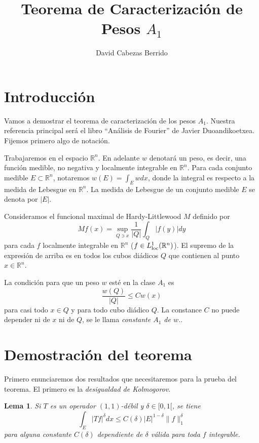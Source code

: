 \documentclass[12pt,english]{article}
\title{Teorema de Caracterización de Pesos $A_1$}
\author{David Cabezas Berrido}
\date{}
\newtheorem{lemma}[theorem]{Lema}
\theoremstyle{definition}
\theoremstyle{remark}
\begin{document}
\maketitle

\section*{Introducción}

Vamos a demostrar el teorema de caracterización de los pesos $A_1$. Nuestra referencia principal será el libro ``Análisis de Fourier'' de Javier Duoandikoetxea. Fijemos primero algo de notación.

Trabajaremos en el espacio $\mathbb{R}^n$. En adelante $w$ denotará un peso, es decir, una función medible, no negativa y localmente integrable en $\mathbb{R}^n$. Para cada conjunto medible $E\subset \mathbb{R}^n$, notaremos $w(E)=\int_E w dx$, donde la integral es respecto a la medida de Lebesgue en $\mathbb{R}^n$. La medida de Lebesgue de un conjunto medible $E$ se denota por $|E|$.

Consideramos el funcional maximal de Hardy-Littlewood $M$ definido por
\begin{equation}\label{eq: H-L}
Mf(x)=\sup_{Q\ni x}\frac{1}{|Q|}\int_Q|f(y)|dy
\end{equation}
para cada $f$ localmente integrable en $\mathbb{R}^n$ \big($f\in L^1_{\rm loc}(\mathbb{R}^n)$\big). El supremo de la expresión de arriba es en todos los cubos diádicos $Q$ que contienen al punto $x\in\mathbb{R}^n$.

La condición para que un peso $w$ esté en la clase $A_1$ es
\begin{equation}\label{eq: A1}
\frac{w(Q)}{|Q|}\leq C w(x) 
\end{equation}
para casi todo $x\in Q$ y para todo cubo diádico $Q$. La constance $C$ no puede depender ni de $x$ ni de $Q$, se le llama \emph{constante $A_1$ de $w$.}.

\section*{Demostración del teorema}

Primero enunciaremos dos resultados que necesitaremos para la prueba del teorema. El primero es la \emph{desigualdad de Kolmogorov}.

\begin{lemma} \label{lm: kolmogorov} Si $T$ es un operador $(1,1)$-débil y $\delta\in [0,1[$, se tiene
	\[\int_E |Tf|^\delta dx\leq C(\delta) |E|^{1-\delta}\|f\|_{1}^\delta\]
	para alguna constante $C(\delta)$ dependiente de $\delta$ válida para toda $f$ integrable.
\end{lemma}
\end{document}
